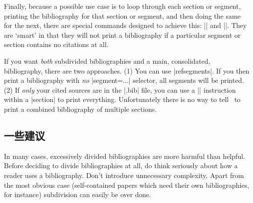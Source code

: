 Finally, because a possible use case is to loop through each
section or segment, printing the bibliography for that section or
segment, and then doing the same for the next, there are special
commands designed to achieve this: |\bibbysection| and
|\bibbysegment|. They are `smart' in that they will not print a
bibliography if a particular segment or section contains no citations
at all.

If you want \emph{both} subdivided bibliographies and a main,
consolidated, bibliography, there are two approaches. (1) You can use
|refsegments|. If you then print a bibliography with \emph{no}
|segment=...| selector, all segments will be printed. (2) If
\emph{only} your cited sources are in the |.bib| file, you can use a
|\nocite{*}| instruction within a |section| to print
everything. Unfortunately there is no way to tell \biblatex\ to print
a combined bibliography of multiple sections.

\subsection{一些建议}

In many cases, excessively divided bibliographies are more harmful
than helpful. Before deciding to divide bibliographies at all, do
think seriously about how a reader uses a bibliography. Don't
introduce unnecessary complexity. Apart from the most obvious case
(self-contained papers which need their own bibliographies, for
instance) subdivision can easily be over done.

